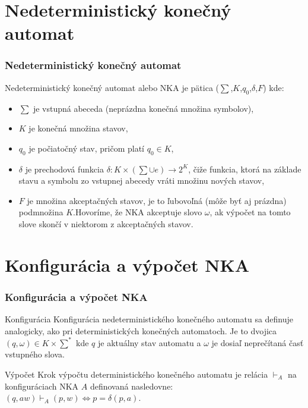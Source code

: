 \documentclass[slovak]{beamer}
\begin{document}
\section{Nedeterministický konečný automat}
\frame
{
    \frametitle{Nedeterministický konečný automat}
        Nedeterministický konečný automat alebo NKA je pätica ($\sum$,$K$,$q_0$,$\delta$,$F$) kde:
        \begin{itemize}
        \item $\sum$ je vstupná abeceda (neprázdna konečná množina symbolov),
        \item $K$ je konečná množina stavov,
        \item $q_0$ je počiatočný stav, pričom platí $q_0 \in K$,
        \item $\delta$ je prechodová funkcia $\delta : K \times (\sum \cup {e}) \rightarrow 2^K$, čiže funkcia, ktorá na základe stavu a symbolu zo vstupnej abecedy vráti množinu nových stavov,
        \item $F$  je množina akceptačných stavov, je to ľubovoľná (môže byť aj prázdna) podmnožina  $K$.Hovoríme, že NKA akceptuje slovo $\omega$, ak výpočet na tomto slove skončí v niektorom z akceptačných stavov.
    \end{itemize}
}

\section{Konfigurácia a výpočet NKA}
\frame
{
    \frametitle{Konfigurácia a výpočet NKA}
    \begin{block}{Konfigurácia}
        Konfigurácia nedeterministického konečného automatu sa definuje analogicky, ako pri deterministických konečných automatoch. Je to dvojica $(q,\omega) \in K \times \sum^*$ kde $q$ je aktuálny stav automatu a $\omega$ je dosiaľ neprečítaná časť vstupného slova.
    \end{block}
        \begin{block}{Výpočet}
    Krok výpočtu deterministického konečného automatu je relácia $\vdash_A$ na konfiguráciach NKA $A$ definovaná nasledovne: $(q,aw) \vdash_A(p,w) \Leftrightarrow p = \delta(p,a)$.
    \end{block}
}
\end{document}

